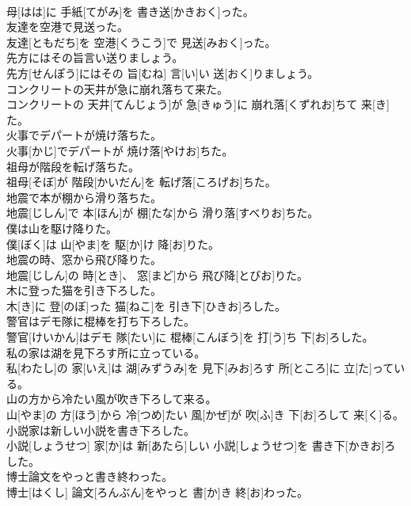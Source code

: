 \documentclass[8pt]{extreport}
\begin{document}
\begin{CJK}{UTF8}{min}
\\	母[はは]に 手紙[てがみ]を 書き送[かきおく]った。
\\	友達を空港で見送った。	
\\	友達[ともだち]を 空港[くうこう]で 見送[みおく]った。
\\	先方にはその旨言い送りましょう。	
\\	先方[せんぽう]にはその 旨[むね] 言[い]い 送[おく]りましょう。
\\	コンクリートの天井が急に崩れ落ちて来た。	
\\	コンクリートの 天井[てんじょう]が 急[きゅう]に 崩れ落[くずれお]ちて 来[き]た。
\\	火事でデパートが焼け落ちた。	
\\	火事[かじ]でデパートが 焼け落[やけお]ちた。
\\	祖母が階段を転げ落ちた。	
\\	祖母[そぼ]が 階段[かいだん]を 転げ落[ころげお]ちた。
\\	地震で本が棚から滑り落ちた。	
\\	地震[じしん]で 本[ほん]が 棚[たな]から 滑り落[すべりお]ちた。
\\	僕は山を駆け降りた。	
\\	僕[ぼく]は 山[やま]を 駆[か]け 降[お]りた。
\\	地震の時、窓から飛び降りた。	
\\	地震[じしん]の 時[とき]、 窓[まど]から 飛び降[とびお]りた。
\\	木に登った猫を引き下ろした。	
\\	木[き]に 登[のぼ]った 猫[ねこ]を 引き下[ひきお]ろした。
\\	警官はデモ隊に棍棒を打ち下ろした。	
\\	警官[けいかん]はデモ 隊[たい]に 棍棒[こんぼう]を 打[う]ち 下[お]ろした。
\\	私の家は湖を見下ろす所に立っている。	
\\	私[わたし]の 家[いえ]は 湖[みずうみ]を 見下[みお]ろす 所[ところ]に 立[た]っている。
\\	山の方から冷たい風が吹き下ろして来る。	
\\	山[やま]の 方[ほう]から 冷[つめ]たい 風[かぜ]が 吹[ふ]き 下[お]ろして 来[く]る。
\\	小説家は新しい小説を書き下ろした。	
\\	小説[しょうせつ] 家[か]は 新[あたら]しい 小説[しょうせつ]を 書き下[かきお]ろした。
\\	博士論文をやっと書き終わった。	
\\	博士[はくし] 論文[ろんぶん]をやっと 書[か]き 終[お]わった。

\end{CJK}
\end{document}
